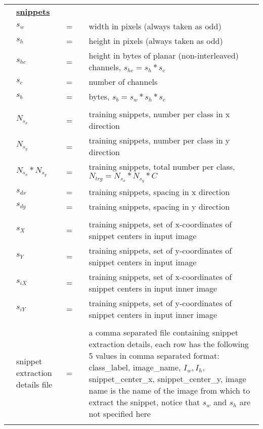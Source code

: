 \documentclass{article}
\begin{document}
\begin{longtable}{llllp{3in}}
&\textbf{\underline{snippets}}&&&																												\\
&$s_{w}$   				&=&& width in pixels (always taken as odd)																			\\
&$s_{h}$  					&=&& height in pixels (always taken as odd)																			\\
&$s_{hc}$  				&=&& height in bytes of planar (non-interleaved) channels, $s_{hc} =s_h * s_c$									\\
&$s_{c}$  					&=&& number of channels																							\\
&$s_{b}$  					&=&& bytes, $s_{b} = s_{w} * s_{h} * s_{c}$																		\\ \\

&$N_{s_x}$   				&=&& training snippets, number per class in x direction 																\\
&$N_{s_y}$  	 			&=&& training snippets, number per class in y direction																\\
&$N_{s_x} * N_{s_y}$    	&=&& training snippets, total number per class, $N_{trg} = N_{s_x} * N_{s_y} * C$									\\
&$s_{dx}$   				&=&& training snippets, spacing in x direction																		\\
&$s_{dy}$  				&=&& training snippets, spacing in y direction																		\\ \\

&$s_X$  					&=&& training snippets, set of x-coordinates of snippet centers in input image										\\ 
&$s_Y$  					&=&& training snippets, set of y-coordinates of snippet centers in input image										\\
&$s_{iX}$  				&=&& training snippets, set of x-coordinates of snippet centers in input inner image								\\ 
&$s_{iY}$  				&=&& training snippets, set of y-coordinates of snippet centers in input inner image								\\ \\


&snippet extraction details file   				&=&& a comma separated file containing snippet extraction details, each row has the following 5 values in comma separated format: class\_label, image\_name, $I_w, I_h$, snippet\_center\_x, snippet\_center\_y, image name is the name of the image from which to extract the snippet, notice that $s_w$ and $s_h$ are not specified here\\ \\



\end{longtable}
\end{document}
